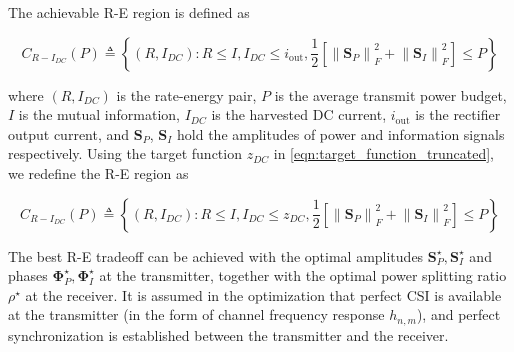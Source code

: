 The achievable R-E region is defined as

\begin{equation}\label{eqn:rate_energy_region}
  {C_{R - {I_{DC}}}}(P) \triangleq \left\{ {\left( {R,{I_{DC}}} \right):R \leqslant I,{I_{DC}} \leqslant {i_{{\text{out}}}},\frac{1}{2}\left[ {\left\| {{{\mathbf{S}}_P}} \right\|_F^2 + \left\| {{{\mathbf{S}}_I}} \right\|_F^2} \right] \leqslant P} \right\}
\end{equation}

where ${\left( {R,{I_{DC}}} \right)}$ is the rate-energy pair, $P$ is the average transmit power budget, $I$ is the mutual information, ${{I_{DC}}}$ is the harvested DC current, ${{i_{{\text{out}}}}}$ is the rectifier output current, and ${{{\mathbf{S}}_P}}$, ${{{\mathbf{S}}_I}}$ hold the amplitudes of power and information signals respectively. Using the target function ${{z_{DC}}}$ in \eqref{eqn:target_function_truncated}, we redefine the R-E region as

\begin{equation}\label{eqn:rate_energy_region_redefined}
  {C_{R - {I_{DC}}}}(P) \triangleq \left\{ {\left( {R,{I_{DC}}} \right):R \leqslant I,{I_{DC}} \leqslant {z_{DC}},\frac{1}{2}\left[ {\left\| {{{\mathbf{S}}_P}} \right\|_F^2 + \left\| {{{\mathbf{S}}_I}} \right\|_F^2} \right] \leqslant P} \right\}
\end{equation}

The best R-E tradeoff can be achieved with the optimal amplitudes ${\mathbf{S}}_P^ \star ,{\mathbf{S}}_I^ \star $ and phases ${\mathbf{\Phi }}_P^ \star ,{\mathbf{\Phi }}_I^ \star $ at the transmitter, together with the optimal power splitting ratio ${\rho ^ \star }$ at the receiver. It is assumed in the optimization that perfect CSI is available at the transmitter (in the form of channel frequency response ${h_{n,m}}$), and perfect synchronization is established between the transmitter and the receiver.

